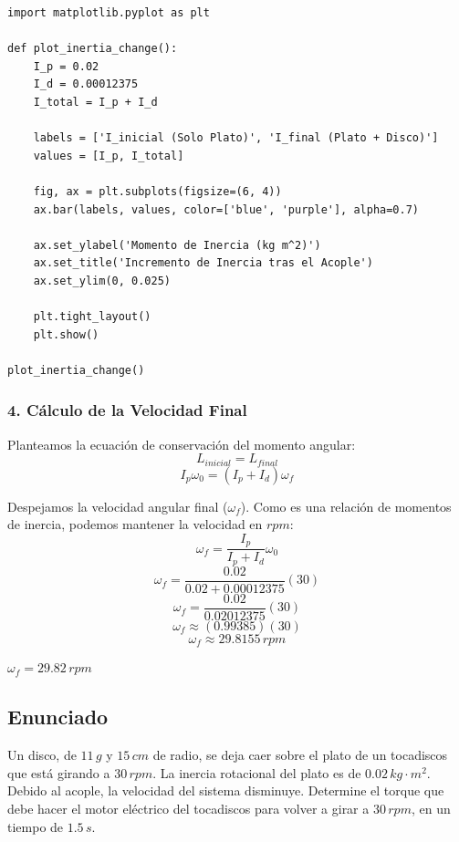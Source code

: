 \documentclass[12pt, a4paper]{article}
\begin{document}
\begin{lstlisting}
import matplotlib.pyplot as plt

def plot_inertia_change():
    I_p = 0.02
    I_d = 0.00012375
    I_total = I_p + I_d
    
    labels = ['I_inicial (Solo Plato)', 'I_final (Plato + Disco)']
    values = [I_p, I_total]
    
    fig, ax = plt.subplots(figsize=(6, 4))
    ax.bar(labels, values, color=['blue', 'purple'], alpha=0.7)
    
    ax.set_ylabel('Momento de Inercia (kg m^2)')
    ax.set_title('Incremento de Inercia tras el Acople')
    ax.set_ylim(0, 0.025)
    
    plt.tight_layout()
    plt.show()

plot_inertia_change()
\end{lstlisting}

\subsubsection*{4. Cálculo de la Velocidad Final}
Planteamos la ecuación de conservación del momento angular:
$$L_{inicial} = L_{final}$$
$$I_p \omega_0 = (I_p + I_d) \omega_f$$

Despejamos la velocidad angular final ($\omega_f$). Como es una relación de momentos de inercia, podemos mantener la velocidad en $\si{rpm}$:
$$\omega_f = \frac{I_p}{I_p + I_d} \omega_0$$
$$\omega_f = \frac{0.02}{0.02 + 0.00012375} (30)$$
$$\omega_f = \frac{0.02}{0.02012375} (30)$$
$$\omega_f \approx (0.99385) (30)$$
$$\omega_f \approx 29.8155 \, \si{rpm}$$

\begin{tcolorbox}[colback=green!5!white, colframe=green!50!black, title=Respuesta Final]
\centering \Large $\omega_f = 29.82 \, \si{rpm}$
\end{tcolorbox}

\newpage

\subsection*{Enunciado}
Un disco, de $11 \, \si{g}$ y $15 \, \si{cm}$ de radio, se deja caer sobre el plato de un tocadiscos que está girando a $30 \, \si{rpm}$. La inercia rotacional del plato es de $0.02 \, \si{kg\cdot m^2}$. Debido al acople, la velocidad del sistema disminuye. Determine el torque que debe hacer el motor eléctrico del tocadiscos para volver a girar a $30 \, \si{rpm}$, en un tiempo de $1.5 \, \si{s}$.
\end{document}
